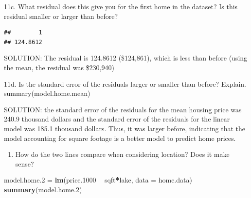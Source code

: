 \documentclass[]{article}
\newenvironment{Shaded}{\begin{snugshade}}{\end{snugshade}}
\newcommand{\KeywordTok}[1]{\textcolor[rgb]{0.13,0.29,0.53}{\textbf{#1}}}
\newcommand{\DataTypeTok}[1]{\textcolor[rgb]{0.13,0.29,0.53}{#1}}
\newcommand{\DecValTok}[1]{\textcolor[rgb]{0.00,0.00,0.81}{#1}}
\newcommand{\StringTok}[1]{\textcolor[rgb]{0.31,0.60,0.02}{#1}}
\newcommand{\OperatorTok}[1]{\textcolor[rgb]{0.81,0.36,0.00}{\textbf{#1}}}
\newcommand{\NormalTok}[1]{#1}
\providecommand{\tightlist}{%
  \setlength{\itemsep}{0pt}\setlength{\parskip}{0pt}}
\begin{document}
11c. What residual does this give you for the first home in the dataset?
Is this residual smaller or larger than before?

\begin{Shaded}
\end{Shaded}

\begin{verbatim}
##        1 
## 124.8612
\end{verbatim}

SOLUTION: The residual is 124.8612 (\$124,861), which is less than
before (using the mean, the residual was \$230,940)

11d. Is the standard error of the residuals larger or smaller than
before? Explain. summary(model.home.mean)

SOLUTION: the standard error of the residuals for the mean housing price
was 240.9 thousand dollars and the standard error of the residuals for
the linear model was 185.1 thousand dollars. Thus, it was larger before,
indicating that the model accounting for square footage is a better
model to predict home prices.

\begin{enumerate}
\def\labelenumi{\arabic{enumi}.}
\setcounter{enumi}{11}
\tightlist
\item
  How do the two lines compare when considering location? Does it make
  sense?
\end{enumerate}

\begin{Shaded}
\begin{Highlighting}[]
\NormalTok{model.home.}\DecValTok{2}\NormalTok{ =}\StringTok{ }\KeywordTok{lm}\NormalTok{(price.}\DecValTok{1000} \OperatorTok{~}\StringTok{ }\NormalTok{sqft}\OperatorTok{*}\NormalTok{lake, }\DataTypeTok{data =}\NormalTok{ home.data)}
\KeywordTok{summary}\NormalTok{(model.home.}\DecValTok{2}\NormalTok{)}
\end{Highlighting}
\end{Shaded}
\end{document}
